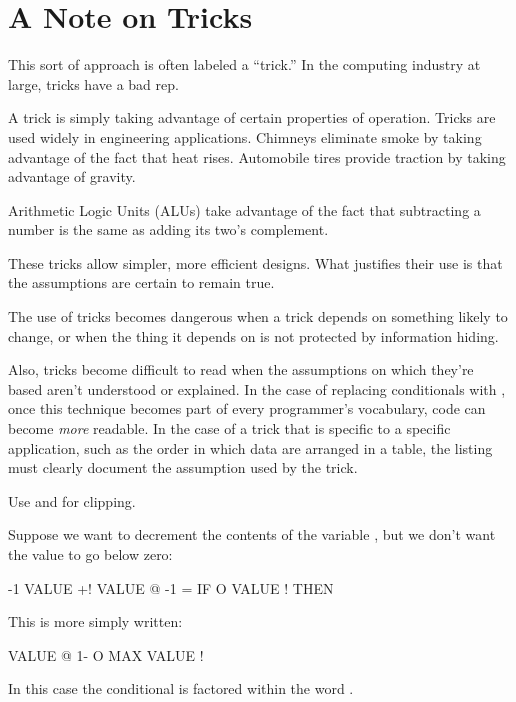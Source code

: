\section{A Note on Tricks}%
%

This sort of approach is often labeled a ``trick.'' In the computing
industry at large, tricks have a bad rep.

A trick is simply taking advantage of certain properties of operation.
Tricks are used widely in engineering applications. Chimneys
eliminate smoke by taking advantage of the fact that heat rises.
Automobile tires provide traction by taking advantage of gravity.

Arithmetic Logic Units (ALUs) take advantage of the fact that
subtracting a number is the same as adding its two's complement.

These tricks allow simpler, more efficient designs. What justifies
their use is that the assumptions are certain to remain true.

The use of tricks becomes dangerous when a trick depends on something
likely to change, or when the thing it depends on is not protected by
information hiding.

Also, tricks become difficult to read when the assumptions on which
they're based aren't understood or explained. In the case of replacing
conditionals with , once this technique becomes part of every
programmer's vocabulary, code can become \emph{more} readable. In the case
of a trick that is specific to a specific application, such as the order
in which data are arranged in a table, the listing must clearly document
the assumption used by the trick.%
%
%

\begin{tip}
Use  and  for clipping.
%
%
\end{tip}
Suppose we want to decrement the contents of the variable , but
we don't want the value to go below zero:

\begin{Code}
-1 VALUE +!  VALUE @  -1 = IF  O VALUE !  THEN
\end{Code}
This is more simply written:

\begin{Code}
VALUE @  1-  O MAX  VALUE !
\end{Code}
In this case the conditional is factored within the word .

